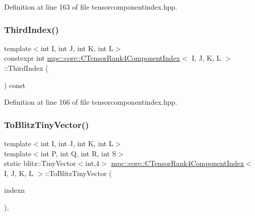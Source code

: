 Definition at line 163 of file tensorcomponentindex.\+hpp.

\mbox{\label{classmpc_1_1core_1_1_c_tensor_rank4_component_index_aaa4260a643cbcf4064ed18a419ade063}} 
\subsubsection{\texorpdfstring{Third\+Index()}{ThirdIndex()}}
{\footnotesize\ttfamily template$<$int I, int J, int K, int L$>$ \\
constexpr int \mbox{\hyperlink{classmpc_1_1core_1_1_c_tensor_rank4_component_index}{mpc\+::core\+::\+C\+Tensor\+Rank4\+Component\+Index}}$<$ I, J, K, L $>$\+::Third\+Index (\begin{DoxyParamCaption}{ }\end{DoxyParamCaption}) const\hspace{0.3cm}{\ttfamily [inline]}}



Definition at line 166 of file tensorcomponentindex.\+hpp.

\mbox{\label{classmpc_1_1core_1_1_c_tensor_rank4_component_index_a343c184dce33f03e52cecf4339f98894}} 
\subsubsection{\texorpdfstring{To\+Blitz\+Tiny\+Vector()}{ToBlitzTinyVector()}}
{\footnotesize\ttfamily template$<$int I, int J, int K, int L$>$ \\
template$<$int P, int Q, int R, int S$>$ \\
static blitz\+::\+Tiny\+Vector$<$int,4$>$ \mbox{\hyperlink{classmpc_1_1core_1_1_c_tensor_rank4_component_index}{mpc\+::core\+::\+C\+Tensor\+Rank4\+Component\+Index}}$<$ I, J, K, L $>$\+::To\+Blitz\+Tiny\+Vector (\begin{DoxyParamCaption}\item[{const \mbox{\hyperlink{classmpc_1_1core_1_1_c_tensor_rank4_component_index}{C\+Tensor\+Rank4\+Component\+Index}}$<$ P, Q, R, S $>$ \&}]{indexn }\end{DoxyParamCaption})\hspace{0.3cm}{\ttfamily [inline]}, {\ttfamily [static]}}



